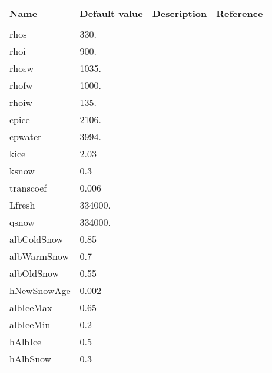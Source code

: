 \newpage

\begin{table}
\hspace*{-1.5in}
\begin{tabular}{lllc}

  \textbf{Name}  &  \textbf{Default value}  
    &  \textbf{Description}   &  \textbf{Reference}  \\
  & & & \\

  rhos   &   330.
    &  %
    &  %
    \\
  rhoi   &   900.
    &  %
    &  %
    \\
  rhosw   &   1035.
    &  %
    &  %
    \\
  rhofw   &   1000.
    &  %
    &  %
    \\
  rhoiw   &   135.
    &  %
    &  %
    \\
  cpice   &   2106.
    &  %
    &  %
    \\
  cpwater   &   3994.
    &  %
    &  %
    \\
  kice   &   2.03
    &  %
    &  %
    \\
  ksnow   &   0.3
    &  %
    &  %
    \\
  transcoef  &   0.006
    &  %
    &  %
    \\
  Lfresh   &   334000.
    &  %
    &  %
    \\
  qsnow   &   334000.
    &  %
    &  %
    \\
  albColdSnow  &   0.85
    &  %
    &  %
    \\
  albWarmSnow  &   0.7
    &  %
    &  %
    \\
  albOldSnow   &   0.55
    &  %
    &  %
    \\
  hNewSnowAge  &   0.002
    &  %
    &  %
    \\
  albIceMax   &   0.65
    &  %
    &  %
    \\
  albIceMin   &   0.2
    &  %
    &  %
    \\
  hAlbIce   &   0.5
    &  %
    &  %
    \\
  hAlbSnow   &   0.3
    &  %
    &  %
    \\

\end{tabular}
\end{table}
